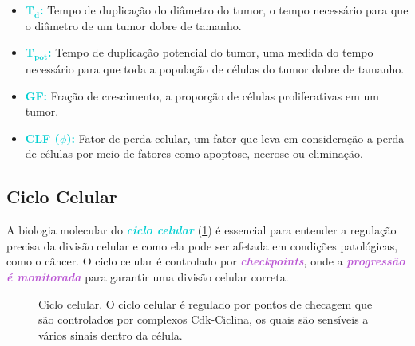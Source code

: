 \documentclass[11pt,a4paper]{article}
\begin{document}
\begin{itemize}
		\item \textcolor{DarkTurquoise}{\textbf{$\mathbf{\text{T}_\text{d}}$:}} Tempo de duplicação do diâmetro do tumor, o tempo necessário para que o diâmetro de um tumor dobre de tamanho.
		\item \textcolor{DarkTurquoise}{\textbf{$\mathbf{\text{T}_\text{pot}}$:}} Tempo de duplicação potencial do tumor, uma medida do tempo necessário para que toda a população de células do tumor dobre de tamanho.
		\item \textcolor{DarkTurquoise}{\textbf{GF:}} Fração de crescimento, a proporção de células proliferativas em um tumor.
		\item \textcolor{DarkTurquoise}{\textbf{CLF ($\phi$):}} Fator de perda celular, um fator que leva em consideração a perda de células por meio de fatores como apoptose, necrose ou eliminação.
	\end{itemize}

\subsection*{Ciclo Celular}

	A biologia molecular do \textcolor{DarkTurquoise}{\textbf{\textit{ciclo celular}}} (\ref{fig:cicloCelular}) é essencial para entender a regulação precisa da divisão celular e como ela pode ser afetada em condições patológicas, como o câncer. O ciclo celular é controlado por \textcolor{MediumOrchid}{\textbf{\textit{checkpoints}}}, onde a \textcolor{MediumOrchid}{\textbf{\textit{progressão é monitorada}}} para garantir uma divisão celular correta.

	\begin{figure}[h]
		\centering
		\caption{Ciclo celular. O ciclo celular é regulado por pontos de checagem que são controlados por complexos Cdk-Ciclina, os quais são sensíveis a vários sinais dentro da célula.}
		\label{fig:cicloCelular}
	\end{figure}
\end{document}
